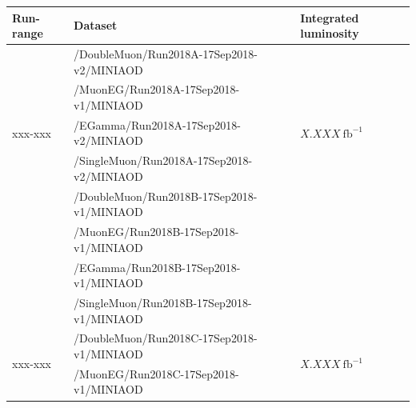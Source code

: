 


\begin{table}[h]
	\scriptsize
	\centering
	\begin{tabular}{|l|l|l|} 
		\hline %
		\hline %
		Run-range & Dataset & Integrated luminosity \\
		\hline %
		\hline %
		\multirow{5}{*}{xxx-xxx} & /DoubleMuon/Run2018A-17Sep2018-v2/MINIAOD &  \multirow{5}{*}{$X.XXX\ \text{fb}^{-1}$} \\ 
		& /MuonEG/Run2018A-17Sep2018-v1/MINIAOD &  \\ 
		& /EGamma/Run2018A-17Sep2018-v2/MINIAOD &  \\ 
		& /SingleMuon/Run2018A-17Sep2018-v2/MINIAOD &  \\ 
		\hline
		\multirow{5}{*}{xxx-xxx} & /DoubleMuon/Run2018B-17Sep2018-v1/MINIAOD &  \multirow{5}{*}{$X.XXX\ \text{fb}^{-1}$}  \\  
		& /MuonEG/Run2018B-17Sep2018-v1/MINIAOD &  \\ 
		& /EGamma/Run2018B-17Sep2018-v1/MINIAOD &  \\ 
		& /SingleMuon/Run2018B-17Sep2018-v1/MINIAOD &  \\ 
		\hline
		\multirow{5}{*}{xxx-xxx} & /DoubleMuon/Run2018C-17Sep2018-v1/MINIAOD &  \multirow{5}{*}{$X.XXX\ \text{fb}^{-1}$} \\ 
		& /MuonEG/Run2018C-17Sep2018-v1/MINIAOD &  \\ 

\end{tabular}
\end{table}
